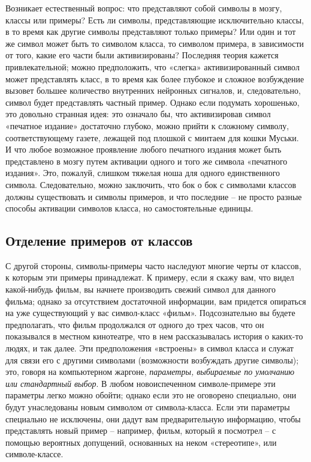 \documentclass[../main.tex]{subfiles}
\begin{document}
Возникает естественный вопрос: что представляют собой символы в мозгу, классы или примеры? Есть ли символы, представляющие исключительно классы, в то время как другие символы представляют только примеры? Или один и тот же символ может быть то символом класса, то символом примера, в зависимости от того, какие его части были активизированы? Последняя теория кажется привлекательной; можно предположить, что «слегка» активизированный символ может представлять класс, в то время как более глубокое и сложное возбуждение вызовет большее количество внутренних нейронных сигналов, и, следовательно, символ будет представлять частный пример. Однако если подумать хорошенько, это довольно странная идея: это означало бы, что активизировав символ «печатное издание» достаточно глубоко, можно прийти к сложному символу, соответствующему газете, лежащей под плошкой с минтаем для кошки Муськи. И что любое возможное проявление любого печатного издания может быть представлено в мозгу путем активации одного и того же символа «печатного издания». Это, пожалуй, слишком тяжелая ноша для одного единственного символа. Следовательно, можно заключить, что бок о бок с символами классов должны существовать и символы примеров, и что последние \--- не просто разные способы активации символов класса, но самостоятельные единицы.


\subsection{Отделение примеров от классов}

С другой стороны, символы-примеры часто наследуют многие черты от классов, к которым эти примеры принадлежат. К примеру, если я скажу вам, что видел какой-нибудь фильм, вы начнете производить свежий символ для данного фильма; однако за отсутствием достаточной информации, вам придется опираться на уже существующий у вас символ-класс «фильм». Подсознательно вы будете предполагать, что фильм продолжался от одного до трех часов, что он показывался в местном кинотеатре, что в нем рассказывалась история о каких-то людях, и так далее. Эти предположения «встроены» в символ класса и служат для связи его с другими символами (возможности возбуждать другие символы); это, говоря на компьютерном жаргоне, \emph{параметры, выбираемые по умолчанию или стандартный выбор}. В любом новоиспеченном символе-примере эти параметры легко можно обойти; однако если это не оговорено специально, они будут унаследованы новым символом от символа-класса. Если эти параметры специально не исключены, они дадут вам предварительную информацию, чтобы представлять новый пример \--- например, фильм, который я посмотрел \--- с помощью вероятных допущений, основанных на неком «стереотипе», или символе-классе.
\end{document}
